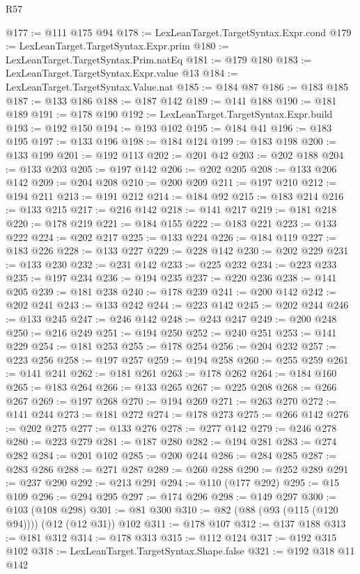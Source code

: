 \begin{lexlean}{R57}
\begin{coremodule}
@177 := @111 @175 @94
@178 := LexLeanTarget.TargetSyntax.Expr.cond
@179 := LexLeanTarget.TargetSyntax.Expr.prim
@180 := LexLeanTarget.TargetSyntax.Prim.natEq
@181 := @179 @180
@183 := LexLeanTarget.TargetSyntax.Expr.value @13
@184 := LexLeanTarget.TargetSyntax.Value.nat
@185 := @184 @87
@186 := @183 @185
@187 := @133 @186
@188 := @187 @142
@189 := @141 @188
@190 := @181 @189
@191 := @178 @190
@192 := LexLeanTarget.TargetSyntax.Expr.build
@193 := @192 @150
@194 := @193 @102
@195 := @184 @41
@196 := @183 @195
@197 := @133 @196
@198 := @184 @124
@199 := @183 @198
@200 := @133 @199
@201 := @192 @113
@202 := @201 @42
@203 := @202 @188
@204 := @133 @203
@205 := @197 @142
@206 := @202 @205
@208 := @133 @206 @142
@209 := @204 @208
@210 := @200 @209
@211 := @197 @210
@212 := @194 @211
@213 := @191 @212
@214 := @184 @92
@215 := @183 @214
@216 := @133 @215
@217 := @216 @142
@218 := @141 @217
@219 := @181 @218
@220 := @178 @219
@221 := @184 @155
@222 := @183 @221
@223 := @133 @222
@224 := @202 @217
@225 := @133 @224
@226 := @184 @119
@227 := @183 @226
@228 := @133 @227
@229 := @228 @142
@230 := @202 @229
@231 := @133 @230
@232 := @231 @142
@233 := @225 @232
@234 := @223 @233
@235 := @197 @234
@236 := @194 @235
@237 := @220 @236
@238 := @141 @205
@239 := @181 @238
@240 := @178 @239
@241 := @200 @142
@242 := @202 @241
@243 := @133 @242
@244 := @223 @142
@245 := @202 @244
@246 := @133 @245
@247 := @246 @142
@248 := @243 @247
@249 := @200 @248
@250 := @216 @249
@251 := @194 @250
@252 := @240 @251
@253 := @141 @229
@254 := @181 @253
@255 := @178 @254
@256 := @204 @232
@257 := @223 @256
@258 := @197 @257
@259 := @194 @258
@260 := @255 @259
@261 := @141 @241
@262 := @181 @261
@263 := @178 @262
@264 := @184 @160
@265 := @183 @264
@266 := @133 @265
@267 := @225 @208
@268 := @266 @267
@269 := @197 @268
@270 := @194 @269
@271 := @263 @270
@272 := @141 @244
@273 := @181 @272
@274 := @178 @273
@275 := @266 @142
@276 := @202 @275
@277 := @133 @276
@278 := @277 @142
@279 := @246 @278
@280 := @223 @279
@281 := @187 @280
@282 := @194 @281
@283 := @274 @282
@284 := @201 @102
@285 := @200 @244
@286 := @284 @285
@287 := @283 @286
@288 := @271 @287
@289 := @260 @288
@290 := @252 @289
@291 := @237 @290
@292 := @213 @291
@294 := @110 (@177 @292)
@295 := @15 @109
@296 := @294 @295
@297 := @174 @296
@298 := @149 @297
@300 := @103 (@108 @298)
@301 := @81 @300
@310 := @82 (@88 (@93 (@115 (@120 @94)))) (@12 (@12 @31)) @102
@311 := @178 @107
@312 := @137 @188
@313 := @181 @312
@314 := @178 @313
@315 := @112 @124
@317 := @192 @315 @102
@318 := LexLeanTarget.TargetSyntax.Shape.false
@321 := @192 @318 @11 @142

\end{coremodule}
\end{lexlean}
